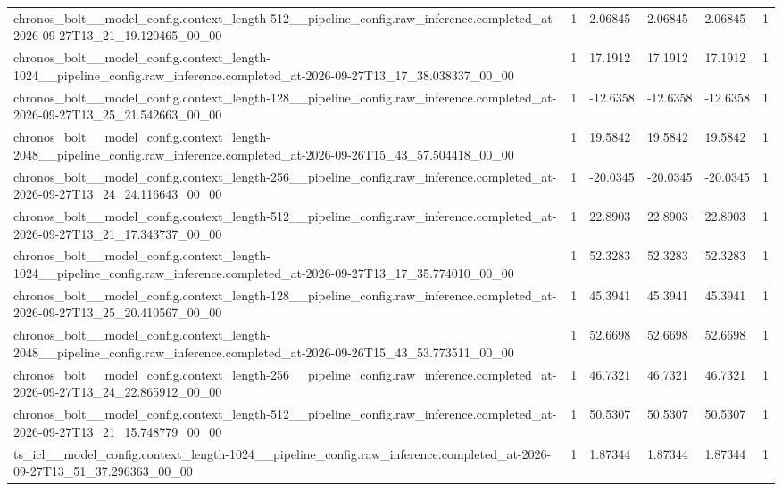 \begin{tabular}{llllll}
chronos\_bolt\_\_model\_config.context\_length-512\_\_pipeline\_config.raw\_inference.completed\_at-2026-09-27T13\_21\_19.120465\_00\_00 & 1 & 2.06845 & 2.06845 & 2.06845 & 1 \\
chronos\_bolt\_\_model\_config.context\_length-1024\_\_pipeline\_config.raw\_inference.completed\_at-2026-09-27T13\_17\_38.038337\_00\_00 & 1 & 17.1912 & 17.1912 & 17.1912 & 1 \\
chronos\_bolt\_\_model\_config.context\_length-128\_\_pipeline\_config.raw\_inference.completed\_at-2026-09-27T13\_25\_21.542663\_00\_00 & 1 & -12.6358 & -12.6358 & -12.6358 & 1 \\
chronos\_bolt\_\_model\_config.context\_length-2048\_\_pipeline\_config.raw\_inference.completed\_at-2026-09-26T15\_43\_57.504418\_00\_00 & 1 & 19.5842 & 19.5842 & 19.5842 & 1 \\
chronos\_bolt\_\_model\_config.context\_length-256\_\_pipeline\_config.raw\_inference.completed\_at-2026-09-27T13\_24\_24.116643\_00\_00 & 1 & -20.0345 & -20.0345 & -20.0345 & 1 \\
chronos\_bolt\_\_model\_config.context\_length-512\_\_pipeline\_config.raw\_inference.completed\_at-2026-09-27T13\_21\_17.343737\_00\_00 & 1 & 22.8903 & 22.8903 & 22.8903 & 1 \\
chronos\_bolt\_\_model\_config.context\_length-1024\_\_pipeline\_config.raw\_inference.completed\_at-2026-09-27T13\_17\_35.774010\_00\_00 & 1 & 52.3283 & 52.3283 & 52.3283 & 1 \\
chronos\_bolt\_\_model\_config.context\_length-128\_\_pipeline\_config.raw\_inference.completed\_at-2026-09-27T13\_25\_20.410567\_00\_00 & 1 & 45.3941 & 45.3941 & 45.3941 & 1 \\
chronos\_bolt\_\_model\_config.context\_length-2048\_\_pipeline\_config.raw\_inference.completed\_at-2026-09-26T15\_43\_53.773511\_00\_00 & 1 & 52.6698 & 52.6698 & 52.6698 & 1 \\
chronos\_bolt\_\_model\_config.context\_length-256\_\_pipeline\_config.raw\_inference.completed\_at-2026-09-27T13\_24\_22.865912\_00\_00 & 1 & 46.7321 & 46.7321 & 46.7321 & 1 \\
chronos\_bolt\_\_model\_config.context\_length-512\_\_pipeline\_config.raw\_inference.completed\_at-2026-09-27T13\_21\_15.748779\_00\_00 & 1 & 50.5307 & 50.5307 & 50.5307 & 1 \\
ts\_icl\_\_model\_config.context\_length-1024\_\_pipeline\_config.raw\_inference.completed\_at-2026-09-27T13\_51\_37.296363\_00\_00 & 1 & 1.87344 & 1.87344 & 1.87344 & 1 \\

\end{tabular}
